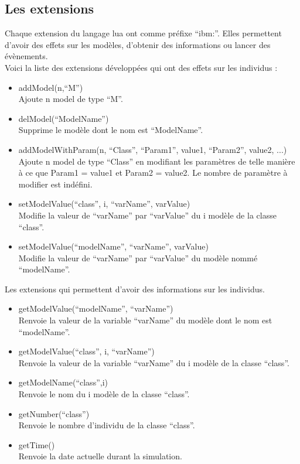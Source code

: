 \subsection{Les extensions}
Chaque extension du langage lua ont comme préfixe ``ibm\string:''. Elles permettent d'avoir des effets sur les modèles, d'obtenir des informations ou lancer des évènements.\\
Voici la liste des extensions développées qui ont des effets sur les individus :
\begin{itemize}[label=\textbullet,font=\large]
	\item addModel(n,``M'')\\
	Ajoute n model de type ``M''.
	\item delModel(``ModelName'')\\
	Supprime le modèle dont le nom est ``ModelName''.
	\item addModelWithParam(n, ``Class'', ``Param1'', value1, ``Param2'', value2, ...)\\
	Ajoute n model de type ``Class'' en modifiant les paramètres de telle manière à ce que Param1 = value1 et Param2 = value2. Le nombre de paramètre à modifier est indéfini.
	\item setModelValue(``class'', i, ``varName'', varValue)\\
	Modifie la valeur de ``varName'' par ``varValue'' du i modèle de la classe ``class''.
	\item setModelValue(``modelName'', ``varName'', varValue)\\
	Modifie la valeur de ``varName'' par ``varValue'' du modèle nommé ``modelName''.
\end{itemize}
Les extensions qui permettent d'avoir des informations sur les individus.
\begin{itemize}[label=\textbullet,font=\large]
	\item getModelValue(``modelName'', ``varName'')\\
	Renvoie la valeur de la variable ``varName'' du modèle dont le nom est ``modelName''.
	\item getModelValue(``class'', i, ``varName'')\\
	Renvoie la valeur de la variable ``varName'' du i modèle de la classe ``class''.
	\item getModelName(``class'',i)\\
	Renvoie le nom du i modèle de la classe ``class''.
	\item getNumber(``class'')\\
	Renvoie le nombre d'individu de la classe ``class''.
	\item getTime()\\
	Renvoie la date actuelle durant la simulation.
\end{itemize}

